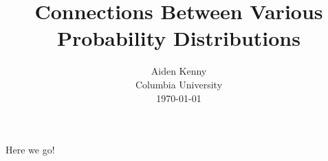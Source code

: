 \documentclass[10pt]{article}
\title{
    {\Large Connections Between Various Probability Distributions}
}
\author{
    {\normalsize Aiden Kenny}\\
    {\normalsize Columbia University}\\
    {\normalsize \today}
}
\date{}
\begin{document}
\maketitle

Here we go!
\end{document}
